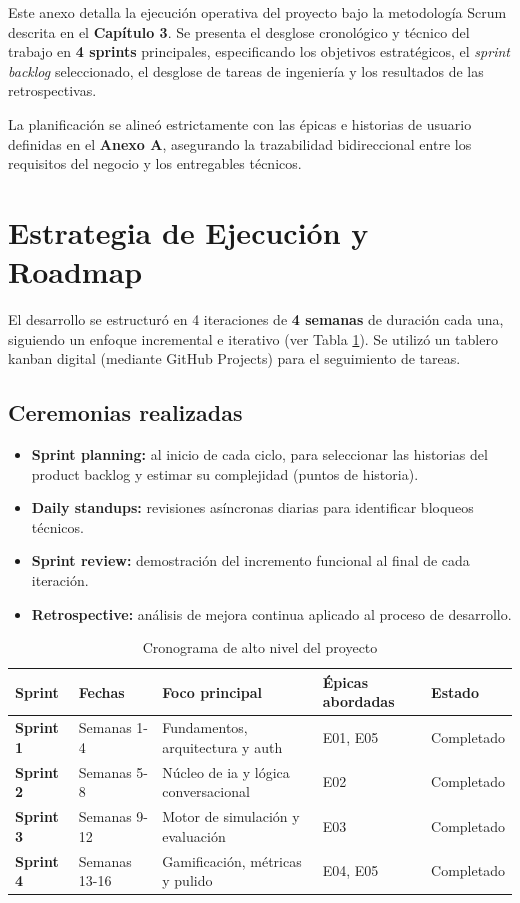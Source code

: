 Este anexo detalla la ejecución operativa del proyecto bajo la metodología Scrum descrita en el \textbf{Capítulo 3}. Se presenta el desglose cronológico y técnico del trabajo en \textbf{4 sprints} principales, especificando los objetivos estratégicos, el \textit{sprint backlog} seleccionado, el desglose de tareas de ingeniería y los resultados de las retrospectivas.

La planificación se alineó estrictamente con las épicas e historias de usuario definidas en el \textbf{Anexo A}, asegurando la trazabilidad bidireccional entre los requisitos del negocio y los entregables técnicos.

\section{Estrategia de Ejecución y Roadmap}

El desarrollo se estructuró en 4 iteraciones de \textbf{4 semanas} de duración cada una, siguiendo un enfoque incremental e iterativo (ver Tabla \ref{tab:cronograma}). Se utilizó un tablero kanban digital (mediante GitHub Projects) para el seguimiento de tareas.

\subsection{Ceremonias realizadas}
\begin{itemize}
\item \textbf{Sprint planning:} al inicio de cada ciclo, para seleccionar las historias del product backlog y estimar su complejidad (puntos de historia).
\item \textbf{Daily standups:} revisiones asíncronas diarias para identificar bloqueos técnicos.
\item \textbf{Sprint review:} demostración del incremento funcional al final de cada iteración.
\item \textbf{Retrospective:} análisis de mejora continua aplicado al proceso de desarrollo.
\end{itemize}

\begin{table}[h]
\centering
\begin{tabularx}{0.95\textwidth}{|l|l|X|l|l|}
\hline
\textbf{Sprint} & \textbf{Fechas} & \textbf{Foco principal} & \textbf{Épicas abordadas} & \textbf{Estado} \\
\hline
\textbf{Sprint 1} & Semanas 1-4 & Fundamentos, arquitectura y auth & E01, E05 & Completado \\
\hline
\textbf{Sprint 2} & Semanas 5-8 & Núcleo de \gls{ia} y lógica conversacional & E02 & Completado \\
\hline
\textbf{Sprint 3} & Semanas 9-12 & Motor de simulación y evaluación & E03 & Completado \\
\hline
\textbf{Sprint 4} & Semanas 13-16 & Gamificación, métricas y pulido & E04, E05 & Completado \\
\hline
\end{tabularx}
\caption{Cronograma de alto nivel del proyecto}
\label{tab:cronograma}
\end{table}

